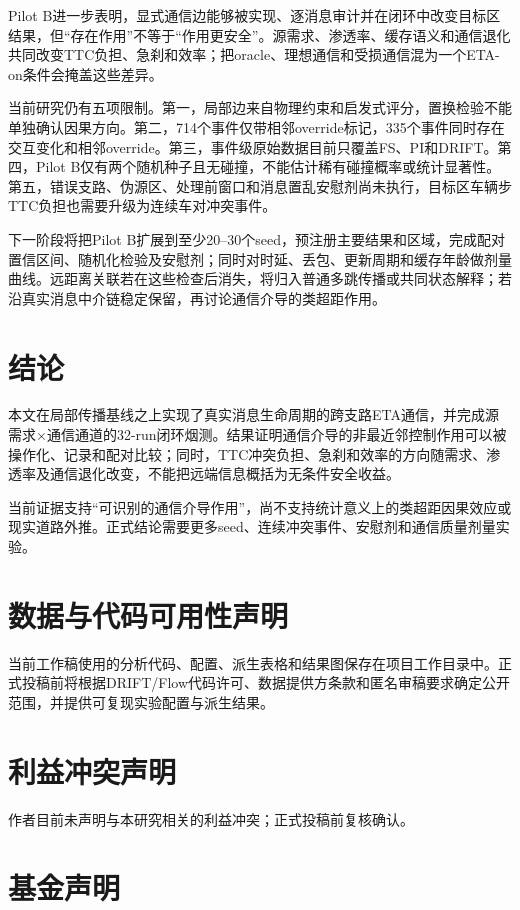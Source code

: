 \documentclass[journal]{IEEEtran}
\begin{document}
Pilot B进一步表明，显式通信边能够被实现、逐消息审计并在闭环中改变目标区结果，但“存在作用”不等于“作用更安全”。源需求、渗透率、缓存语义和通信退化共同改变TTC负担、急刹和效率；把oracle、理想通信和受损通信混为一个ETA-on条件会掩盖这些差异。

当前研究仍有五项限制。第一，局部边来自物理约束和启发式评分，置换检验不能单独确认因果方向。第二，714个事件仅带相邻override标记，335个事件同时存在交互变化和相邻override。第三，事件级原始数据目前只覆盖FS、PI和DRIFT。第四，Pilot B仅有两个随机种子且无碰撞，不能估计稀有碰撞概率或统计显著性。第五，错误支路、伪源区、处理前窗口和消息置乱安慰剂尚未执行，目标区车辆步TTC负担也需要升级为连续车对冲突事件。

下一阶段将把Pilot B扩展到至少20--30个seed，预注册主要结果和区域，完成配对置信区间、随机化检验及安慰剂；同时对时延、丢包、更新周期和缓存年龄做剂量曲线。远距离关联若在这些检查后消失，将归入普通多跳传播或共同状态解释；若沿真实消息中介链稳定保留，再讨论通信介导的类超距作用。

\section{结论}\label{sec:conclusion}

本文在局部传播基线之上实现了真实消息生命周期的跨支路ETA通信，并完成源需求$\times$通信通道的32-run闭环烟测。结果证明通信介导的非最近邻控制作用可以被操作化、记录和配对比较；同时，TTC冲突负担、急刹和效率的方向随需求、渗透率及通信退化改变，不能把远端信息概括为无条件安全收益。

当前证据支持“可识别的通信介导作用”，尚不支持统计意义上的类超距因果效应或现实道路外推。正式结论需要更多seed、连续冲突事件、安慰剂和通信质量剂量实验。

\section*{数据与代码可用性声明}

当前工作稿使用的分析代码、配置、派生表格和结果图保存在项目工作目录中。正式投稿前将根据DRIFT/Flow代码许可、数据提供方条款和匿名审稿要求确定公开范围，并提供可复现实验配置与派生结果。

\section*{利益冲突声明}

作者目前未声明与本研究相关的利益冲突；正式投稿前复核确认。

\section*{基金声明}
\end{document}
